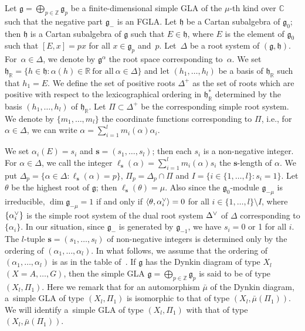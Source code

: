 \documentclass[11pt]{article}
\numberwithin{equation}{section}
\numberwithin{theorem}{section}
\numberwithin{proposition}{section}
\numberwithin{lemma}{section}
\numberwithin{corollary}{section}
\numberwithin{definition}{section}
\numberwithin{example}{section}
\numberwithin{remark}{section}
\numberwithin{note}{section}
\newcommand{\gla}[1]{\mathfrak#1=\bigoplus\limits_{p\in\mathbb Z}\mathfrak#1_p} \renewcommand{\labelenumi}{{\rm (\arabic{enumi})}}
\begin{document}
Let $\gla g$ be a f\/inite-dimensional simple GLA of the $\mu$-th kind over
$\mathbb C$ such that the negative part $\mathfrak g_-$ is an FGLA.
Let $\mathfrak h$ be a Cartan subalgebra of $\mathfrak g_0$;
then $\mathfrak h$ is a Cartan subalgebra of $\mathfrak g$ such that
$E\in \mathfrak h$, where
$E$ is  the element of $\mathfrak g_0$ such that
$[E,x]=px$ for all $x\in\mathfrak g_p$ and~$p$.
Let~$\Delta$ be
a root system of $(\mathfrak g,\mathfrak h)$. For~$\alpha\in\Delta$,
we denote by $\mathfrak g^{\alpha}$ the root space corresponding to~$\alpha$. We set
$\mathfrak h_\mathbb R=\{ h\in\mathfrak h:\alpha(h)\in\mathbb R\ \text{for all}\ \alpha\in \Delta \}$
and let $(h_1,\dots,h_l)$ be a basis of $\mathfrak h_\mathbb R$ such that
$h_1=E$.
We def\/ine the set of positive roots $\Delta^+$ as the set of roots
which are positive with respect to the lexicographical ordering
in $\mathfrak h_{\mathbb R}^*$ determined by the basis $(h_1,\dots,h_l)$ of
$\mathfrak h_{\mathbb R}$.
Let $\Pi\subset \Delta^+$ be the corresponding simple root system.
We denote by $\{m_1,\dots,m_l\}$ the coordinate functions
corresponding to $\Pi$, i.e., for $\alpha\in\Delta$,
we can write $\alpha=\sum\limits_{i=1}^l m_i(\alpha)\alpha_i$.

We set $\alpha_i(E)=s_i$ and $\bm s=(s_1,\dots,s_l)$;
then each $s_i$ is a non-negative integer.
For $\alpha\in\Delta$, we call the integer
$\ell_{\bm s}(\alpha)=\sum\limits_{i=1}^l m_i(\alpha)s_i$ the
$\bm s$-length of $\alpha$.
We put $\Delta_p=\{ \alpha\in\Delta: \ell_{\bm s}(\alpha)=p \}$,
$\Pi_p=\Delta_p\cap \Pi$ and $I=\{ i\in\{1,\dots,l\}: s_i=1 \}$.
Let $\theta$ be the highest root of $\mathfrak g$; then
$\ell_{\bm s}(\theta)=\mu$. Also since the $\mathfrak g_0$-module
$\mathfrak g_{-\mu}$ is irreducible,
$\dim \mathfrak g_{-\mu}=1$
if and only if $\langle \theta,\alpha\spcheck_i\rangle=0$ for all
$i\in\{1,\dots,l\}\setminus I$, where $\{\alpha\spcheck_i\}$ is the simple root system of the dual root system $\Delta\spcheck$ of $\Delta$ corresponding
to $\{\alpha_i\}$.
In our situation, since $\mathfrak g_-$ is generated by
$\mathfrak g_{-1}$, we have $s_i=0$ or 1 for all $i$.
The $l$-tuple $\bm s=(s_1,\dots,s_l)$ of non-negative integers
is determined only by the ordering of $(\alpha_1,\dots,\alpha_l)$.
In what follows, we assume that the ordering of
$(\alpha_1,\dots,\alpha_l)$ is as in the table of~\cite{bou68:1}.
If $\mathfrak g$ has the Dynkin diagram of type $X_l$ $(X=A,\dots,G)$,
then the simple GLA $\gla g$
is said to be of type $(X_l,\Pi_1)$.
Here we remark that for an automorphism $\bar{\mu}$ of the
Dynkin diagram, a~simple GLA of type $(X_l,\Pi_1)$
is isomorphic to that of type $(X_l,\bar{\mu}(\Pi_1))$.
We will identify a~simple GLA of type $(X_l,\Pi_1)$
with that of type $(X_l,\bar{\mu}(\Pi_1))$.
\end{document}
